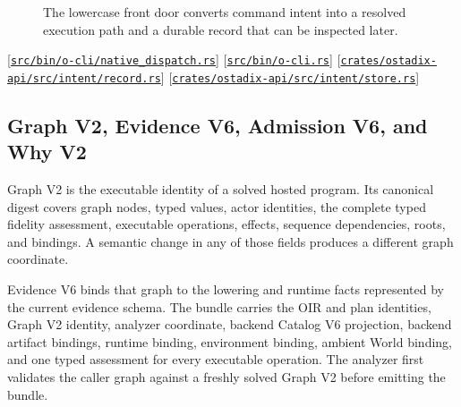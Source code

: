 \documentclass[11pt,oneside]{article}
\newcommand{\src}[1]{\textcolor{OSlate}{\scriptsize[\href{https://github.com/lostadi/OSTADIX/blob/c0b02c326b2329a95ba52447c7180bc93957cd57/#1}{\nolinkurl{#1}}]}\allowbreak}
\begin{document}
\begin{figure}[htbp]
\centering
{}
\caption{The lowercase front door converts command intent into a resolved
execution path and a durable record that can be inspected later.}
\label{fig:o-front-door}
\end{figure}

\src{src/bin/o-cli/native_dispatch.rs}
\src{src/bin/o-cli.rs}
\src{crates/ostadix-api/src/intent/record.rs}
\src{crates/ostadix-api/src/intent/store.rs}

\subsection{Graph V2, Evidence V6, Admission V6, and Why V2}
\label{sec:v6}

Graph V2 is the executable identity of a solved hosted program. Its canonical
digest covers graph nodes, typed values, actor identities, the complete typed
fidelity assessment, executable operations, effects, sequence dependencies,
roots, and bindings. A semantic change in any of those fields produces a
different graph coordinate.

Evidence V6 binds that graph to the lowering and runtime facts represented
by the current evidence schema.
The bundle carries the OIR and plan identities, Graph V2 identity, analyzer
coordinate, backend Catalog V6 projection, backend artifact bindings, runtime
binding, environment binding, ambient World binding, and one typed assessment
for every executable operation. The analyzer first validates the caller graph
against a freshly solved Graph V2 before emitting the bundle.
\end{document}
